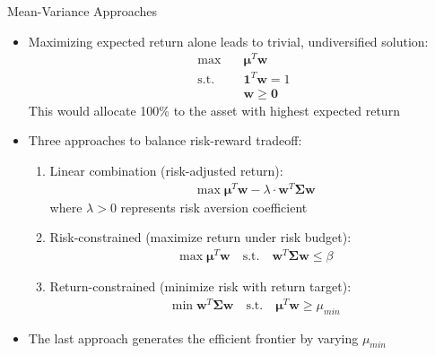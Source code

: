 \documentclass[10pt]{beamer}
\begin{document}
\begin{frame}{Mean-Variance Approaches}
  \begin{itemize}[<+->]
    \item Maximizing expected return alone leads to trivial, undiversified solution:
      \begin{align*}
        \max \quad & \boldsymbol{\mu}^T\mathbf{w}\\
        \text{s.t.} \quad & \mathbf{1}^T\mathbf{w} = 1\\
        & \mathbf{w} \geqslant \mathbf{0}
      \end{align*}
      This would allocate 100\% to the asset with highest expected return
    \item Three approaches to balance risk-reward tradeoff:
      \begin{enumerate}
        \item Linear combination (risk-adjusted return): 
        \begin{align*}
            \max \boldsymbol{\mu}^T\mathbf{w} - \lambda \cdot \mathbf{w}^T\mathbf{\Sigma}\mathbf{w}
        \end{align*}
        where $\lambda > 0$ represents risk aversion coefficient
        
        \item Risk-constrained (maximize return under risk budget): 
        \begin{align*}
            \max \boldsymbol{\mu}^T\mathbf{w} \quad \text{s.t.} \quad \mathbf{w}^T\mathbf{\Sigma}\mathbf{w} \leqslant \beta
        \end{align*}
        
        \item Return-constrained (minimize risk with return target): 
        \begin{align*}
            \min \mathbf{w}^T\mathbf{\Sigma}\mathbf{w} \quad \text{s.t.} \quad \boldsymbol{\mu}^T\mathbf{w} \geqslant \mu_{min}
        \end{align*}
      \end{enumerate}
    \item The last approach generates the efficient frontier by varying $\mu_{min}$
  \end{itemize}
\end{frame}
\end{document}
